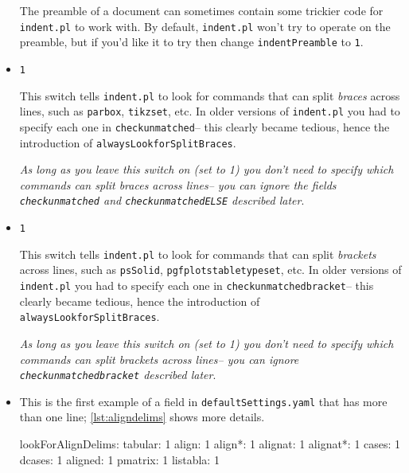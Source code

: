 \begin{itemize}
 		The preamble of a document can sometimes contain some trickier code 
 		for \lstinline!indent.pl! to work with. By default, \lstinline!indent.pl!
 		won't try to operate on the preamble, but if you'd like it to try then 
 		change \lstinline!indentPreamble! to \lstinline!1!.
 		\item[\verbitem{alwaysLookforSplitBraces}] \lstinline!1!
 		 					
 		This switch tells \lstinline!indent.pl! to look for commands that 
 		can split \emph{braces} across lines, such as \lstinline!parbox!, \lstinline!tikzset!, etc. In older
 		versions of \lstinline!indent.pl! you had to specify each one in \lstinline!checkunmatched!-- this 
 		clearly became tedious, hence the introduction of \lstinline!alwaysLookforSplitBraces!. 
 		 					
 		\emph{As long as you leave this switch on (set to 1) you don't need to specify which 
 			commands can split braces across lines-- you can ignore the 
 			fields \lstinline!checkunmatched! and \lstinline!checkunmatchedELSE! described later}.
 		\item[\verbitem{alwaysLookforSplitBrackets}] \lstinline!1!
 		 					
 		This switch tells \lstinline!indent.pl! to look for commands that 
 		can split \emph{brackets} across lines, such as \lstinline!psSolid!, \lstinline!pgfplotstabletypeset!, 
 		etc. In older versions of \lstinline!indent.pl! you had to specify each one in \lstinline!checkunmatchedbracket!-- 
 		this clearly became tedious, hence the introduction of \lstinline!alwaysLookforSplitBraces!. 
 		 					
 		\emph{As long as you leave this switch on (set to 1) you don't need to specify which 
 			commands can split brackets across lines-- you can ignore \lstinline!checkunmatchedbracket! described later}.
 		 					
 		\item[\verbitem{lookForAlignDelims}] This is the first example of a field
 		in \lstinline!defaultSettings.yaml! that has more than one line; \cref{lst:aligndelims}
 		shows more details.
 		 					
 		\begin{yaml}[caption={\lstinline!lookForAlignDelims!},label={lst:aligndelims}]
lookForAlignDelims:
   tabular: 1
   align: 1
   align*: 1
   alignat: 1
   alignat*: 1
   cases: 1
   dcases: 1
   aligned: 1
   pmatrix: 1
   listabla: 1
 		\end{yaml}
 		 					

\end{itemize}
